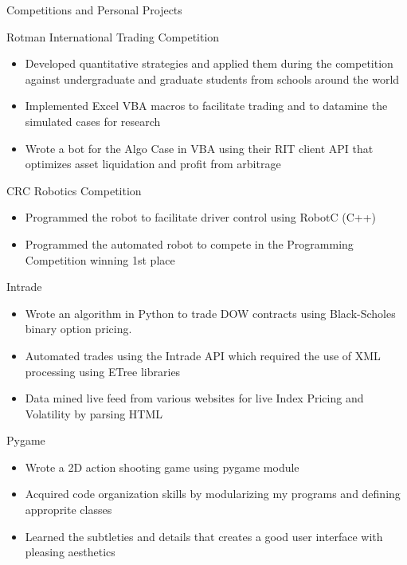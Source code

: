 \documentclass{article}
\newlength{\tabin}
\newlength{\secsep}
\newcommand{\lineunder}{\vspace*{-8pt} \\ \hspace*{-6pt} \hrulefill \\ \vspace*{-15pt}}
\newenvironment{tabbedsection}[1]{
  \begin{list}{}{
      \setlength{\itemsep}{0pt}
      \setlength{\labelsep}{0pt}
      \setlength{\labelwidth}{0pt}
      \setlength{\leftmargin}{\tabin}
      \setlength{\rightmargin}{\tabin}
      \setlength{\listparindent}{0pt}
      \setlength{\parsep}{0pt}
      \setlength{\parskip}{0pt}
      \setlength{\partopsep}{0pt}
      \setlength{\topsep}{#1}
    }
  \item[]
}{\end{list}}
\newenvironment{resume_section}[1]{
  \filbreak
  \vspace{2\secsep}
  \textsc{\large#1}
  \lineunder
  \begin{tabbedsection}{\secsep}
}{\end{tabbedsection}}
\newenvironment{resume_subsection}[2][]{
  \textbf{#2} \hfill {\footnotesize #1} \hspace{2em}
  \begin{tabbedsection}{0.5\secsep}
}{\end{tabbedsection}}
\newenvironment{subitems}{
  \renewcommand{\labelitemi}{-}
  \begin{itemize}
      \setlength{\labelsep}{1em}
}{\end{itemize}}
\begin{document}
\begin{resume_section}{Competitions and Personal Projects}
  \begin{resume_subsection}[(Feburary 2013)]{Rotman International Trading Competition}
  \begin{subitems}
    \item Developed quantitative strategies and applied them during the competition against undergraduate and graduate students from schools around the world
    \item Implemented Excel VBA macros to facilitate trading and to datamine the simulated cases for research
    \item Wrote a bot for the Algo Case in VBA using their RIT client API that optimizes asset liquidation and profit from arbitrage
    \end{subitems}
  \end{resume_subsection}



  \begin{resume_subsection}[(Feburary 2012)]{CRC Robotics Competition}
    \begin{subitems}
        \item Programmed the robot to facilitate driver control using RobotC (C++)
        \item Programmed the automated robot to compete in the Programming Competition winning 1st place
    \end{subitems}
  \end{resume_subsection}


  \begin{resume_subsection}[(December 2012)]{Intrade}
    \begin{subitems}
        \item Wrote an algorithm in Python to trade DOW contracts using Black-Scholes binary option pricing.
        \item Automated trades using the Intrade API which required the use of XML processing using ETree libraries
        \item Data mined live feed from various websites for live Index Pricing and Volatility by parsing HTML
    \end{subitems}
  \end{resume_subsection}
  
    \begin{resume_subsection}{Pygame}
    \begin{subitems}
        \item Wrote a 2D action shooting game using pygame module
        \item Acquired code organization skills by modularizing my programs and defining approprite classes
        \item Learned the subtleties and details that creates a good user interface with pleasing aesthetics
    \end{subitems}
  \end{resume_subsection}
  

\end{resume_section}
\end{document}
